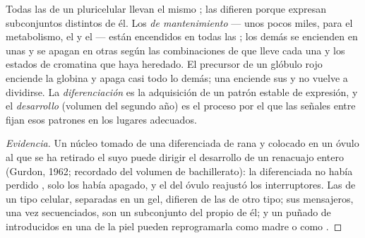\begin{proposition}\label{prop:b1:expression-control:differentiation}
Todas las  de un  pluricelular llevan el mismo ; las
 difieren porque expresan subconjuntos distintos de él. Los 
\emph{de mantenimiento} --- unos pocos miles, para el metabolismo, el
 y el  --- están encendidos en todas las ; los
demás se encienden en unas  y se apagan en otras según las
combinaciones de  que lleve cada una y los estados
de cromatina que haya heredado. El precursor de un glóbulo rojo enciende la
globina y apaga casi todo lo demás; una  enciende sus  y no
vuelve a dividirse. La \emph{diferenciación} es la adquisición de un patrón
estable de expresión, y el \emph{desarrollo} (volumen del segundo año) es el
proceso por el que las señales entre  fijan esos patrones en los
lugares adecuados.
\end{proposition}
\begin{proof}[Evidencia]
Un núcleo tomado de una  diferenciada de rana y colocado en un óvulo
al que se ha retirado el suyo puede dirigir el desarrollo de un renacuajo
entero (Gurdon, 1962; recordado del volumen de bachillerato): la 
diferenciada no había perdido , solo los había apagado, y el 
del óvulo reajustó los interruptores. Las  de un tipo celular,
separadas en un gel, difieren de las de otro tipo; sus mensajeros, una vez
secuenciados, son un subconjunto del  propio de él; y un puñado de
 introducidos en una  de la piel pueden
reprogramarla como  madre o como .
\end{proof}

